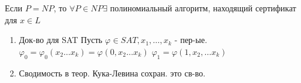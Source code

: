 	\begin{statement}
		 Если $P = NP$, то $\forall P \in NP \exists$ полиномиальный алгоритм, находящий сертификат для $x\in L$
		 \proof
		\begin{enumerate}
			\item Док-во для SAT
			Пусть $\varphi \in SAT, x_1,\ldots,x_k$ - пер-ые.
			$\varphi_0 = \varphi_0 (x_2\ldots x_k) = \varphi(0,x_2 \ldots x_k)$
			$\varphi_1 = \varphi(1,x_2,\ldots x_k)$
			
			\item Сводимость в теор. Кука-Левина сохран. это св-во.
		\end{enumerate}
	\end{statement}